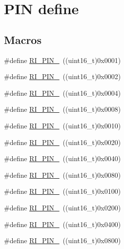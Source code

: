 \hypertarget{group___r_i___pin}{\section{P\-I\-N define}
\label{group___r_i___pin}
}
\subsection*{Macros}
\begin{DoxyCompactItemize}
\item 
\#define \hyperlink{group___r_i___pin_ga989e7aedb415c13bb98ddc4d96cfaea1}{R\-I\-\_\-\-P\-I\-N\-\_}~((uint16\-\_\-t)0x0001)
\item 
\#define \hyperlink{group___r_i___pin_gaae78f54d0bdfc28f2c6281dd5e6d6731}{R\-I\-\_\-\-P\-I\-N\-\_}~((uint16\-\_\-t)0x0002)
\item 
\#define \hyperlink{group___r_i___pin_gaa274394025b195740a30e1f8ebe2b4e2}{R\-I\-\_\-\-P\-I\-N\-\_}~((uint16\-\_\-t)0x0004)
\item 
\#define \hyperlink{group___r_i___pin_ga4c79fe9dcee5bda36f7067ed22ba77a4}{R\-I\-\_\-\-P\-I\-N\-\_}~((uint16\-\_\-t)0x0008)
\item 
\#define \hyperlink{group___r_i___pin_ga7f443ade586a8aa3be0da85eee9e7fb9}{R\-I\-\_\-\-P\-I\-N\-\_}~((uint16\-\_\-t)0x0010)
\item 
\#define \hyperlink{group___r_i___pin_ga0db731223773e6d28b38134e64c40076}{R\-I\-\_\-\-P\-I\-N\-\_}~((uint16\-\_\-t)0x0020)
\item 
\#define \hyperlink{group___r_i___pin_gafdb2d5d7e07e02f945d51d509bb54cce}{R\-I\-\_\-\-P\-I\-N\-\_}~((uint16\-\_\-t)0x0040)
\item 
\#define \hyperlink{group___r_i___pin_ga6dfdbc6035e977af6d9191805a51f8c8}{R\-I\-\_\-\-P\-I\-N\-\_}~((uint16\-\_\-t)0x0080)
\item 
\#define \hyperlink{group___r_i___pin_gae80b308782b3bf8dc7c7ca756cd26493}{R\-I\-\_\-\-P\-I\-N\-\_}~((uint16\-\_\-t)0x0100)
\item 
\#define \hyperlink{group___r_i___pin_ga1e3cdb6c6e8aa36f83e2bb38f41331f4}{R\-I\-\_\-\-P\-I\-N\-\_}~((uint16\-\_\-t)0x0200)
\item 
\#define \hyperlink{group___r_i___pin_gafa3387738d707b9a48178d140d643496}{R\-I\-\_\-\-P\-I\-N\-\_}~((uint16\-\_\-t)0x0400)
\item 
\#define \hyperlink{group___r_i___pin_ga962eca26189e20d9baa081670fe2cda5}{R\-I\-\_\-\-P\-I\-N\-\_}~((uint16\-\_\-t)0x0800)

\end{DoxyCompactItemize}
